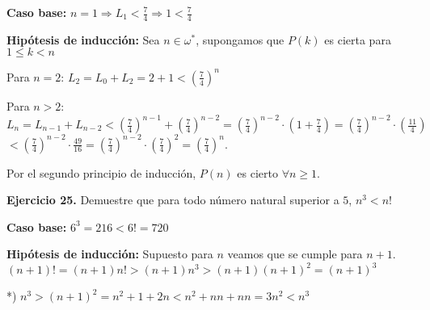 \documentclass[a4papper, 11pt]{article}
\begin{document}
\begin{flushleft}
\textbf{Caso base:}  $n = 1  \Rightarrow L_{1} < \frac{7}{4} \Rightarrow 1 < \frac{7}{4}$ \newline 

\textbf{Hipótesis de inducción:} Sea $n \in \omega^{*}$, supongamos que $P(k)$ es cierta para $1 \leq k < n$ \newline

Para $n=2$:  \hfil $L_{2} = L_{0} + L_{2} = 2+1 < (\frac{7}{4})^{n}$ \newline

Para $n > 2$:
\hfil $L_{n} = L_{n-1} + L_{n-2} < (\frac{7}{4})^{n-1} + (\frac{7}{4})^{n-2} = (\frac{7}{4})^{n-2} \cdot (1+ \frac{7}{4}) = (\frac{7}{4})^{n-2} \cdot (\frac{11}{4})$ \newline
$< (\frac{7}{4}) ^{n-2} \cdot \frac{49}{16} = (\frac{7}{4})^{n-2} \cdot (\frac{7}{4})^{2} = (\frac{7}{4})^{n}$. \newline

Por el segundo principio de inducción, $P(n)$ es cierto $\forall n \ge 1$. \newline


\textbf{Ejercicio 25.} Demuestre que para todo número natural superior a $5 $, $n^{3} < n!$ \newline

\textbf{Caso base:} $6^{3} = 216 < 6! = 720$ \newline

\textbf{Hipótesis de inducción:} Supuesto para $n$ veamos que se cumple para $n+1.$ \newline
\hfil $(n+1)! = (n+1)n! > (n+1)n^{3} > (n+1)(n+1)^{2} = (n+1)^{3}$ \newline

*) $n^{3} > (n+1)^{2} = n^{2} + 1 + 2n < n^{2} + nn + nn = 3n^{2} < n^{3}$ \newline






	      
	      
	      
	
	
	
\end{flushleft}
\end{document}

